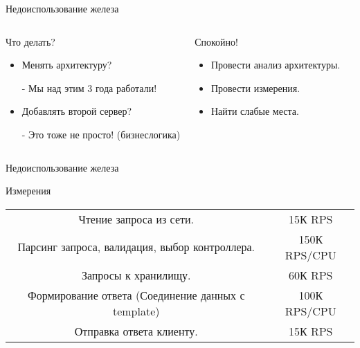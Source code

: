\documentclass[aspectratio=169]{beamer}
\begin{document}
\begin{frame}{Недоиспользование железа}

    \begin{columns}
        \begin{block}{Что делать?}
            \begin{itemize}
                \pause\item Менять архитектуру?
                    \pause\par - Мы над этим 3 года работали!

                \pause\item Добавлять второй сервер?
                    \pause\par - Это тоже не просто! (бизнеслогика)
            \end{itemize}
        \end{block}

        \begin{block}{Спокойно!}
            \begin{itemize}
                \pause\item Провести анализ архитектуры.
                \pause\item Провести измерения.
                \pause\item Найти слабые места.
            \end{itemize}
        \end{block}
    \end{columns}
\end{frame}

\begin{frame}{Недоиспользование железа}
    \begin{block}{Измерения}
        \begin{tabular}{ c c }

            \pause Чтение запроса из сети. & 15К RPS  \\
            \pause Парсинг запроса, валидация, выбор контроллера. & 150К RPS/CPU  \\
            \pause Запросы к хранилищу. & 60К RPS \\
            \pause Формирование ответа (Соединение данных с template) & 100К RPS/CPU \\
            \pause Отправка ответа клиенту. & 15К RPS \\

        \end{tabular}
    \end{block}
\end{frame}
    
\end{document}
